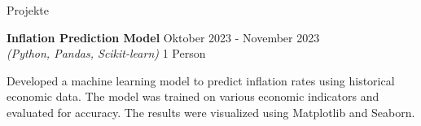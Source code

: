 \documentclass{resume} %
\begin{document}
\begin{rSection}{Projekte}
\begin{adjustwidth}{0.5cm}{}
        \item \textbf{Inflation Prediction Model} \hfill {Oktober 2023 - November 2023} \\
        \textit{(Python, Pandas, Scikit-learn)} \hfill {1 Person}\\
        \raggedright{Developed a machine learning model to predict inflation rates using historical economic data. The model was trained on various economic indicators and evaluated for accuracy. The results were visualized using Matplotlib and Seaborn.}

    \end{adjustwidth}
    
\end{rSection}
\end{document}
